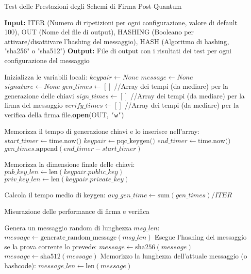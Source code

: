 \begin{breakablealgorithm}
\caption{Test delle Prestazioni degli Schemi di Firma Post-Quantum}
\begin{algorithmic}[1]
\State \textbf{Input:} ITER (Numero di ripetizioni per ogni configurazione, valore di default 100), OUT (Nome del file di output), HASHING (Booleano per attivare/disattivare l'hashing del messaggio), HASH (Algoritmo di hashing, "sha256" o "sha512")
\State \textbf{Output:} File di output con i risultati dei test per ogni configurazione del messaggio

\State Inizializza le variabili locali:
\State $keypair \gets None$
\State $message \gets None$
\State$signature \gets None$
\State $gen\_times \gets [ ]$  //Array dei tempi (da mediare) per la generazione delle chiavi
\State $sign\_times \gets [ ]$  //Array dei tempi (da mediare) per la firma del messaggio
\State $verify\_times \gets [ ]$  //Array dei tempi (da mediare) per la verifica della firma
\State file.\textbf{open}(OUT, \texttt{'w'})

        \State Memorizza il tempo di generazione chiavi e lo inserisce nell'array: 
        \State $start\_timer \gets \text{time.now()}$
        \State $keypair \gets \text{pqc\_keygen()}$
        \State $end\_timer \gets \text{time.now()}$
        \State $gen\_times.\text{append}(end\_timer - start\_timer)$
    \EndFor
    
    \State Memorizza la dimensione finale delle chiavi: 
    \State $pub\_key\_len \gets \text{len}(keypair.public\_key)$
    \State $priv\_key\_len \gets \text{len}(keypair.private\_key)$

    \State Calcola il tempo medio di keygen: 
    \State $avg\_gen\_time \gets \text{sum}(gen\_times) / ITER$

    \State Misurazione delle performance di firma e verifica

        \State Genera un messaggio random di lunghezza $msg\_len$: 
        \State $message \gets \text{generate\_random\_message}(msg\_len)$
        \State Esegue l'hashing del messaggio se la prova corrente lo prevede:
                \State $message \gets \text{sha256}(message)$
                \State $message \gets \text{sha512}(message)$
            \EndIf
        \EndIf
        \State Memorizzo la lunghezza dell'attuale messaggio (o hashcode):
        \State $message\_len \gets \text{len}(message)$
    

\end{algorithmic}
\end{breakablealgorithm}
